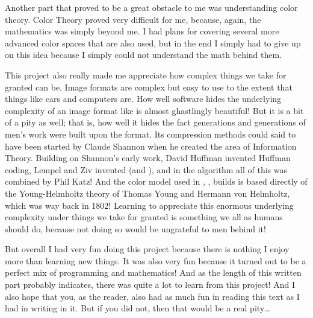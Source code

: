 Another part that proved to be a great obstacle to me was
understanding color theory. Color Theory proved very difficult for me,
because, again, the mathematics was simply beyond me. I had plans for
covering several more advanced color spaces that are also used, but in
the end I simply had to give up on this idea because I simply could
not understand the math behind them.

This project also really made me appreciate how complex things we take
for granted can be. Image formats are complex but easy to use to the
extent that things like cars and computers are. How well software
hides the underlying complexity of an image format like \png is almost
ghastlingly beautiful! But it is a bit of a pity as well; that is, how
well it hides the fact generations and generations of men's work were
built upon the format. Its compression methods could said to have been
started by Claude Shannon when he created the area of Information
Theory. Building on Shannon's early work, David Huffman invented
Huffman coding, Lempel and Ziv invented \lzone(and \lztwo), and in the
 algorithm all of this was combined by Phil Katz! And the
color model used in \png, \rgb, builds is based directly of the
Young-Helmholtz theory of Thomas Young and Hermann von Helmholtz,
which was way back in 1802! Learning to appreciate this enormous
underlying complexity under things we take for granted is something we
all as humans should do, because not doing so would be ungrateful to
men behind it!

But overall I had very fun doing this project because there is nothing
I enjoy more than learning new things. It was also very fun because it
turned out to be a perfect mix of programming and mathematics! And as
the length of this written part probably indicates, there was quite a
lot to learn from this project! And I also hope that you, as the
reader, also had as much fun in reading this text as I had in writing
in it. But if you did not, then that would be a real pity\dots
